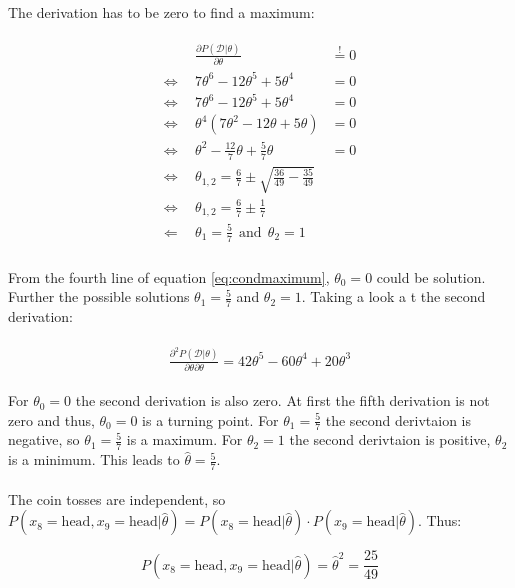 \documentclass{article}
\begin{document}
The derivation has to be zero to find a maximum:

\begin{align}\label{eq:condmaximum}
\begin{aligned}
				&\frac{\partial P(\mathcal{D}|\theta)}{\partial \theta} &\overset{!}{=} 0\\
\Leftrightarrow	~~	& 7\theta^6 - 12 \theta^5 + 5 \theta^4 &= 0\\
\Leftrightarrow	~~	& 7\theta^6 - 12 \theta^5 + 5 \theta^4 &= 0\\
\Leftrightarrow	~~	& \theta^4(7\theta^2 - 12 \theta + 5 \theta) &= 0\\
\Leftrightarrow	~~	& \theta^2 - \frac{12}{7} \theta + \frac{5}{7} \theta &= 0\\
\Leftrightarrow	~~	& \theta_{1,2} = \frac{6}{7} \pm \sqrt{\frac{36}{49} - \frac{35}{49}} \\
\Leftrightarrow	~~	& \theta_{1,2} = \frac{6}{7} \pm \frac{1}{7} \\
\Leftarrow	~~	& \theta_{1} = \frac{5}{7} ~~ \text{and} ~~ \theta_{2} =1 \\
\end{aligned}
\end{align}

From the fourth line of equation \ref{eq:condmaximum}, $\theta_0 = 0$ could be solution. Further the possible solutions $ \theta_{1} = \frac{5}{7}$ and $\theta_{2} =1$. Taking a look a t the second derivation:

\begin{align}
\begin{aligned}
\frac{\partial^2 P(\mathcal{D}|\theta)}{\partial \theta \partial \theta} = 42\theta^5 - 60 \theta^4 + 20 \theta^3
\end{aligned}
\end{align}

For $\theta_0 = 0$ the second derivation is also zero. At first the fifth derivation is not zero and thus, $\theta_0 = 0$ is a turning point. For $\theta_1 = \frac{5}{7}$ the second derivtaion is negative, so  $\theta_1 = \frac{5}{7}$ is a maximum. For $\theta_2 = 1$ the second derivtaion is positive,  $\theta_2$ is a minimum. This leads to $\hat\theta = \frac{5}{7}$.\\
\\
The coin tosses are independent, so $P(x_8 = \text{head}, x_9 = \text{head} | \hat\theta) = P(x_8 = \text{head}|\hat\theta) \cdot P(x_9 =\text{head}|\hat\theta)$. Thus:

\begin{equation}
P(x_8 = \text{head}, x_9 = \text{head} | \hat\theta) = \hat\theta^2 = \frac{25}{49}
\end{equation}
\end{document}
